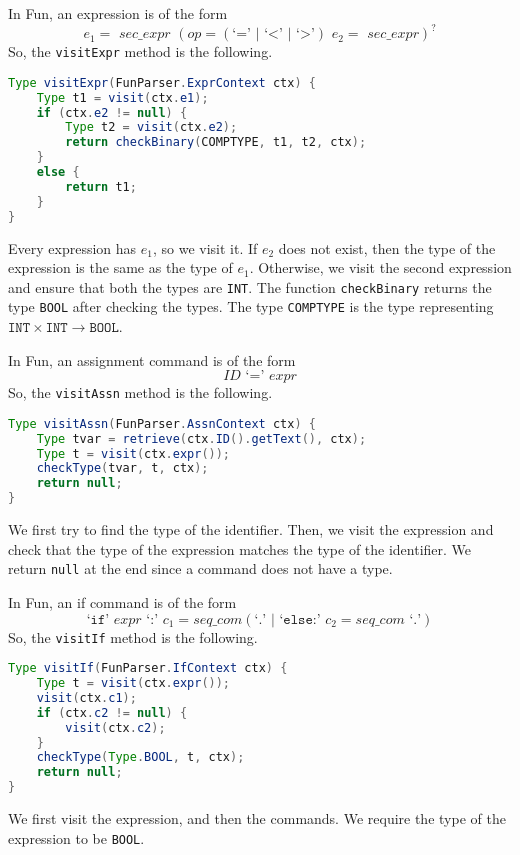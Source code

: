 \documentclass[a4paper, openany]{memoir}
\begin{document}
In Fun, an expression is of the form
\[\textit{e}_1 = \textit{ sec\_expr } (\textit{op} = (\text{`}\texttt{=}\text{' } | \text{ `}\texttt{<}\text{' } | \text{ `}\texttt{>}\text{'}) \textit{ e}_2 = \textit{ sec\_expr})^?\]
So, the \texttt{visitExpr} method is the following.
\begin{lstlisting}[language=java]
Type visitExpr(FunParser.ExprContext ctx) {
    Type t1 = visit(ctx.e1);
    if (ctx.e2 != null) {
        Type t2 = visit(ctx.e2);
        return checkBinary(COMPTYPE, t1, t2, ctx);
    }
    else {
        return t1;
    }
}
\end{lstlisting}
\noindent Every expression has $\textit{e}_1$, so we visit it. If $\textit{e}_2$ does not exist, then the type of the expression is the same as the type of $\textit{e}_1$. Otherwise, we visit the second expression and ensure that both the types are \texttt{INT}. The function \texttt{checkBinary} returns the type \texttt{BOOL} after checking the types. The type \texttt{COMPTYPE} is the type representing $\texttt{INT} \times \texttt{INT} \to \texttt{BOOL}$.

In Fun, an assignment command is of the form
\[\textit{ID} \text{ `}\texttt{=}\text{' } \textit{expr}\]
So, the \texttt{visitAssn} method is the following.
\begin{lstlisting}[language=java]
Type visitAssn(FunParser.AssnContext ctx) {
    Type tvar = retrieve(ctx.ID().getText(), ctx);
    Type t = visit(ctx.expr());
    checkType(tvar, t, ctx);
    return null;
}
\end{lstlisting}
We first try to find the type of the identifier. Then, we visit the expression and check that the type of the expression matches the type of the identifier. We return \texttt{null} at the end since a command does not have a type.

In Fun, an if command is of the form
\[\text{`}\texttt{if}\text{' } \textit{expr} \text{ `}\texttt{:}\text{' } \textit{c}_1 = \textit{seq\_com} (\text{`}\texttt{.}\text{' } | \text{ `}\texttt{else:}\text{' } \textit{c}_2 = \textit{seq\_com} \text{ `}\texttt{.}\text{'})\]
So, the \texttt{visitIf} method is the following.
\begin{lstlisting}[language=java]
Type visitIf(FunParser.IfContext ctx) {
    Type t = visit(ctx.expr());
    visit(ctx.c1);
    if (ctx.c2 != null) {
        visit(ctx.c2);
    }
    checkType(Type.BOOL, t, ctx);
    return null;
}
\end{lstlisting}
We first visit the expression, and then the commands. We require the type of the expression to be \texttt{BOOL}.
\end{document}
